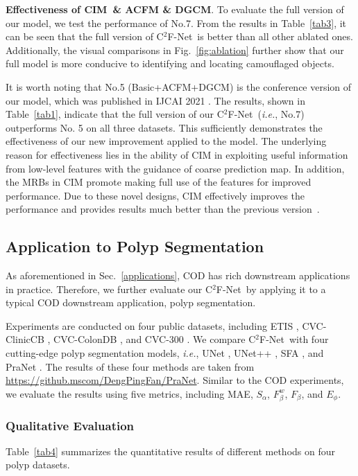 \documentclass[lettersize,journal]{IEEEtran}
\newcommand{\ourM}{{C$^2$F-Net}}
\newcommand{\ourB}{CIM} %
\def\ie{\emph{i.e.}}
\begin{document}
\textbf{Effectiveness of \ourB~\& ACFM \& DGCM}. To evaluate the full version of our model, we test the performance of No.7. From the results in Table~\ref{tab3}, it can be seen that the full version of \ourM~is better than all other ablated ones. Additionally, the visual comparisons in Fig.~\ref{fig:ablation} further show that our full model is more conducive to identifying and locating camouflaged objects.

It is worth noting that No.5 (Basic+ACFM+DGCM) is the conference version of our model, which was published in IJCAI 2021 \cite{c2f}. The results, shown in Table~\ref{tab1}, indicate that the full version of our \ourM~(\ie, No.7) outperforms No. 5 on all three datasets. This sufficiently demonstrates the effectiveness of our new improvement applied to the model.
The underlying reason for effectiveness lies in the ability of CIM in exploiting useful information from low-level features with the guidance of coarse prediction map. In addition, the MRBs in CIM promote making full use of the features for improved performance. Due to these novel designs, CIM effectively improves the performance and provides results much better than the previous version~\cite{c2f}.


\subsection{Application to Polyp Segmentation}\label{polyseg}

As aforementioned in Sec.~\ref{applications}, COD has rich downstream applications in practice. Therefore, we further evaluate our \ourM~by applying it to a typical COD downstream application, polyp segmentation.

Experiments are conducted on four public datasets, including ETIS \cite{ETIS}, CVC-ClinicCB \cite{clinicDB}, CVC-ColonDB \cite{colonDB}, and CVC-300 \cite{CVC-300}. We compare \ourM~with four cutting-edge polyp segmentation models, \ie, UNet \cite{unet}, UNet++ \cite{unetplus}, SFA \cite{fang2019selective}, and PraNet \cite{pranet}. The results of these four methods are taken from \url{https://github.mscom/DengPingFan/PraNet}.
Similar to the COD experiments, we evaluate the results using five metrics, including MAE, {$S_\alpha$}, {$F_\beta^w$}, {$F_\beta$}, and {$E_\phi$}.


\subsubsection{Qualitative Evaluation}
Table~\ref{tab4} summarizes the quantitative results of different methods on four polyp datasets. 
\end{document}
